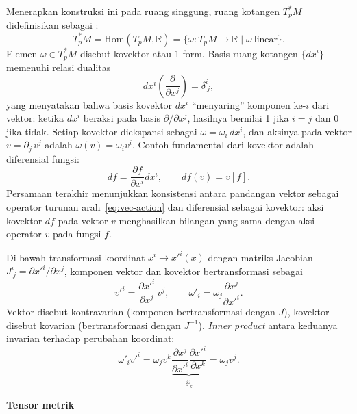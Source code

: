 Menerapkan konstruksi ini pada ruang singgung, ruang kotangen $T_p^*M$ didefinisikan sebagai \cite{nakahara2003geometry}:
\begin{equation}
    T_p^*M = \mathrm{Hom}(T_pM, \mathbb{R}) = \{\omega : T_pM \to \mathbb{R} \mid \omega\ \text{linear}\}.
\end{equation}
Elemen $\omega \in T_p^*M$ disebut kovektor atau 1-form. Basis ruang kotangen $\{dx^i\}$ memenuhi relasi dualitas
\begin{equation}\label{eq:duality}
    dx^i\!\left(\frac{\partial}{\partial x^j}\right) = \delta^i_{\ j},
\end{equation}
yang menyatakan bahwa basis kovektor $dx^i$ ``menyaring'' komponen ke-$i$ dari vektor: ketika $dx^i$ beraksi pada basis $\partial/\partial x^j$, hasilnya bernilai 1 jika $i = j$ dan 0 jika tidak. Setiap kovektor diekspansi sebagai $\omega = \omega_i \, dx^i$, dan aksinya pada vektor $v = \partial_j\, v^j$ adalah $\omega(v) = \omega_i v^i$. Contoh fundamental dari kovektor adalah diferensial fungsi:
\begin{equation}
    df = \frac{\partial f}{\partial x^i} dx^i, \qquad df(v) = v[f].
\end{equation}
Persamaan terakhir menunjukkan konsistensi antara pandangan vektor sebagai operator turunan arah~\eqref{eq:vec-action} dan diferensial sebagai kovektor: aksi kovektor $df$ pada vektor $v$ menghasilkan bilangan yang sama dengan aksi operator $v$ pada fungsi $f$.

Di bawah transformasi koordinat $x^i \to x'^i(x)$ dengan matriks Jacobian $J^i_{\ j} = \partial x'^i/\partial x^j$, komponen vektor dan kovektor bertransformasi sebagai \cite{carroll2019spacetime}
\begin{equation}\label{eq:contravariant}
    v'^i = \frac{\partial x'^i}{\partial x^j}\, v^j, \qquad
    \omega'_i = \omega_j \frac{\partial x^j}{\partial x'^i}.
\end{equation}
Vektor disebut kontravarian (komponen bertransformasi dengan $J$), kovektor disebut kovarian (bertransformasi dengan $J^{-1}$). \textit{Inner product} antara keduanya invarian terhadap perubahan koordinat:
\begin{equation}
    \omega'_i v'^i = \omega_j v^k \underbrace{\frac{\partial x^j}{\partial x'^i} \frac{\partial x'^i}{\partial x^k}}_{\delta^j_{\ k}} = \omega_j v^j.
\end{equation}

\vspace{0.5em}
\noindent \textbf{Tensor metrik}

